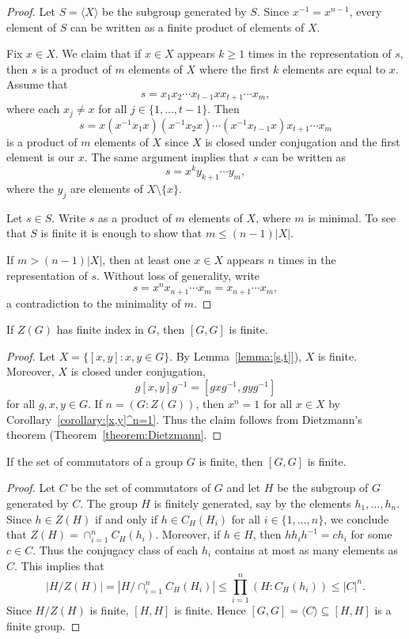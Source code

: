 \begin{proof}
	Let $S=\langle X\rangle$ be the subgroup generated by $S$. Since $x^{-1}=x^{n-1}$, every element 
	of $S$ can be written as a finite product of elements of $X$. 
	
	Fix $x\in X$. We claim that if $x\in X$ appears $k\geq 1$ times in the representation of $s$, then 
	$s$ is a product of $m$
	elements of $X$ where the first $k$ elements are equal to $x$. Assume that 
	\[
	s=x_1x_2\cdots x_{t-1}xx_{t+1}\cdots x_m,
	\]
	where each $x_j\ne x$ for all $j\in\{1,\dots,t-1\}$. Then 
	\[
		s=x(x^{-1}x_1x)(x^{-1}x_2x)\cdots (x^{-1}x_{t-1}x)x_{t+1}\cdots x_m
	\]
	is a product of $m$ elements of $X$ since $X$ is closed under conjugation and
	the first element is our $x$. The same argument implies that $s$
	can be written as 
	\[
		s=x^ky_{k+1}\cdots y_m,
	\]
	where the $y_j$ are elements of $X\setminus\{x\}$.

	Let $s\in S$. Write $s$ as a product of $m$ elements of $X$,
	where $m$ is minimal. To see that $S$ is finite it is enough to show that  
	$m\leq (n-1)|X|$. 
	
	If $m>(n-1)|X|$, then 
	at least one $x\in X$ appears $n$ times in the representation of $s$. Without loss of generality, write
	\[
		s=x^nx_{n+1}\cdots x_m=x_{n+1}\cdots x_m,
	\]
	a contradiction to the minimality of $m$. 
\end{proof}

\begin{theorem}[Schur]
	\label{theorem:Schur_commutador}
	If $Z(G)$ has finite index in $G$, then $[G,G]$ is finite. 
\end{theorem}

\begin{proof}
	Let $X=\{[x,y]:x,y\in G\}$. By Lemma~\ref{lemma:[s,t]}), $X$ is finite.
	Moreover, $X$ is closed under conjugation, 
	\[
		g[x,y]g^{-1}=[gxg^{-1},gyg^{-1}]
	\]
	for all $g,x,y\in G$. If $n=(G:Z(G))$, then $x^n=1$ for all $x\in X$
	by Corollary~\ref{corollary:[x,y]^n=1}. Thus the claim follows from 
	Dietzmann's theorem (Theorem~\ref{theorem:Dietzmann}.
\end{proof}

\begin{corollary}[Sury]
	If the set of commutators of a group $G$ is finite, then 
	$[G,G]$ is finite.
\end{corollary}

\begin{proof}
	Let $C$ be the set of commutators of $G$ and let $H$ be the subgroup of $G$ 
	generated by $C$. The group $H$ is finitely generated, say by the elements 
	$h_1,\dots,h_n$. Since $h\in Z(H)$ if and only if $h\in C_H(H_i)$ for all 
	$i\in\{1,\dots,n\}$, we conclude that $Z(H)=\cap_{i=1}^n C_H(h_i)$. Moreover, if 
	$h\in H$, then $hh_ih^{-1}=ch_i$ for some $c\in C$. Thus the conjugacy class of each 
	$h_i$ contains at most as many elements as $C$. This implies that 
	\[
		|H/Z(H)|=|H/\cap_{i=1}^n C_H(H_i)|\leq\prod_{i=1}^n (H:C_H(h_i))\leq |C|^n.
	\]
	Since $H/Z(H)$ is finite, $[H,H]$ is finite. Hence  
	$[G,G]=\langle C\rangle\subseteq [H,H]$ 
	is a finite group.
\end{proof}

